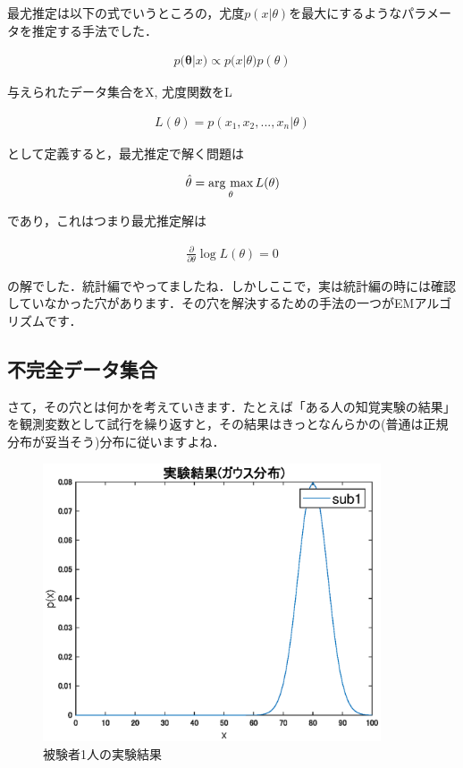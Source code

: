 \documentclass[11pt,a4paper,dvipdfmx]{ujreport}
\newcommand{\argmax}{\mathop{\rm arg~max}\limits}
\begin{document}
最尤推定は以下の式でいうところの，尤度$p(x|\theta)$を最大にするようなパラメータを推定する手法でした．

\begin{align}
  p(\mathbf{\theta}|x) \propto p(x|{\theta)p(\theta)}
\end{align}

与えられたデータ集合をX, 尤度関数をL

\begin{align}
  L(\theta) = p(x_1, x_2, ... , x_n | \theta)
\end{align}
  
として定義すると，最尤推定で解く問題は

\begin{align}
  \hat{\theta} = \argmax_\theta L(\theta)
\end{align}

であり，これはつまり最尤推定解は

\begin{align}
  \frac{\partial}{\partial \theta}\log L(\theta) = 0
  \label{eq:ml}
\end{align}

の解でした．統計編でやってましたね．しかしここで，実は統計編の時には確認していなかった穴があります．その穴を解決するための手法の一つがEMアルゴリズムです．\\

\subsection{不完全データ集合}
さて，その穴とは何かを考えていきます．たとえば「ある人の知覚実験の結果」を観測変数として試行を繰り返すと，その結果はきっとなんらかの(普通は正規分布が妥当そう)分布に従いますよね．

\begin{figure}[H]
  \centering
  \label{im:gauss-test1}
  \includegraphics[width=10cm]{../figures/test1.eps}
  \caption{被験者1人の実験結果}
\end{figure}
\end{document}

